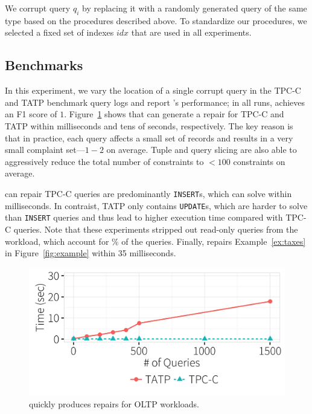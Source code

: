  We corrupt query $q_i$ by replacing it with a randomly
generated query of the same type based on the procedures described above.
To standardize our procedures, we selected a fixed set of indexes $idx$
that are used in all experiments. 



\subsection{Benchmarks}
\label{sec:experiments:benchmark}
In this experiment, we vary the location of a single corrupt query in the TPC-C and TATP benchmark query logs and report \sys's performance;
in all runs, \sys achieves an F1 score of $1$.
Figure~\ref{f:tpcctatp} shows that \sys can generate a repair for TPC-C and TATP within milliseconds and tens of seconds, respectively.
The key reason is that in practice, each query affects a small set of records and results in a very small complaint set---$1-2$ on average.
Tuple and query slicing are also able to aggressively reduce the total number of constraints to $<100$ constraints on average.

\sys can repair TPC-C  queries are predominantly \texttt{INSERT}s, which \sys can solve within milliseconds. 
In contraist, TATP only contains \texttt{UPDATE}s, which are harder to solve than \texttt{INSERT} queries and thus lead to higher execution time compared with TPC-C queries.
Note that these experiments stripped out read-only queries from the workload, which account for \% of the queries.
Finally, \sys repairs Example~\ref{ex:taxes} in Figure~\ref{fig:example} within 35 milliseconds. 

\begin{figure}[h]
\centering
  \includegraphics[width = .75\columnwidth]{figures/benchmark_time}
  \vspace*{-.2in}
  \caption{\sys quickly produces repairs for OLTP workloads.}
  \label{f:tpcctatp} 
\end{figure}

